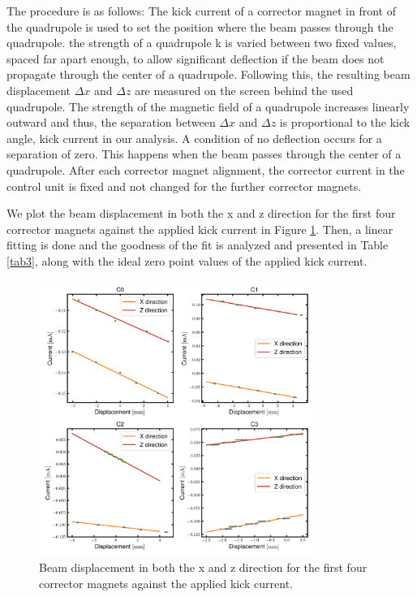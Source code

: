 \documentclass[12pt]{article}
\begin{document}
The procedure is as follows: The kick current of a corrector magnet in front of the quadrupole is used to set the position where the beam passes through the quadrupole. the strength of a quadrupole k is varied between two fixed values, spaced far apart enough, to allow significant deflection if the beam does not propagate through the center of a quadrupole. Following this, the resulting beam displacement $\Delta x$ and $\Delta z$ are measured on the screen behind the used quadrupole. 
The strength of the magnetic field of a quadrupole increases linearly outward and thus, the separation between $\Delta x$ and $\Delta z$ is proportional to the kick angle, kick current in our analysis. A condition of no deflection occurs for a separation of zero. This happens when the beam passes through the center of a quadrupole.  After each corrector magnet alignment, the corrector current in the control unit is fixed and not changed for the further corrector magnets. 

We plot the beam displacement in both the x and z direction for the first four corrector magnets against the applied kick current in Figure \ref{beam based alignment}. Then, a linear fitting is done and the goodness of the fit is analyzed and presented in Table \ref{tab3}, along with the ideal zero point values of the applied kick current.

\begin{figure}[H]
    \centering
    \includegraphics[width = 0.8\textwidth]{fig/beambasealinghment.png}
    \caption{Beam displacement in both the x and z direction for the first
four corrector magnets against the applied kick current.}
    \label{beam based alignment}
\end{figure}
\end{document}
